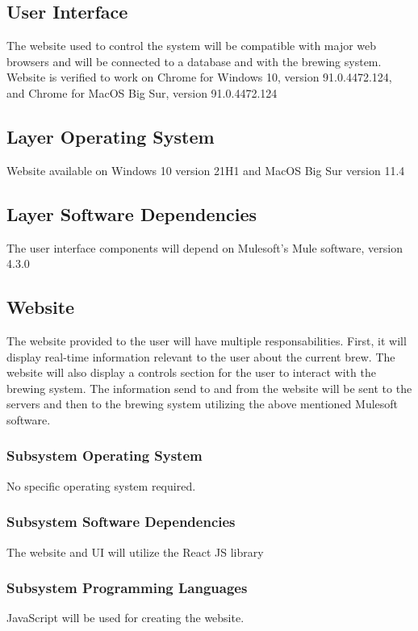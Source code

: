 \subsection{User Interface}
The website used to control the system will be compatible with major web browsers and will be connected to a database and with the brewing system. Website is verified to work on Chrome for Windows 10, version 91.0.4472.124, and Chrome for MacOS Big Sur, version 91.0.4472.124

\subsection{Layer Operating System}
Website available on Windows 10 version 21H1 and MacOS Big Sur version 11.4

\subsection{Layer Software Dependencies}
The user interface components will depend on Mulesoft's Mule software, version 4.3.0

\subsection{Website}
The website provided to the user will have multiple responsabilities. First, it will display real-time information relevant to the user about the current brew. The website will also display a controls section for the user to interact with the brewing system. The information send to and from the website will be sent to the servers and then to the brewing system utilizing the above mentioned Mulesoft software.

\subsubsection{Subsystem Operating System}
No specific operating system required.

\subsubsection{Subsystem Software Dependencies}
The website and UI will utilize the React JS library

\subsubsection{Subsystem Programming Languages}
JavaScript will be used for creating the website.
